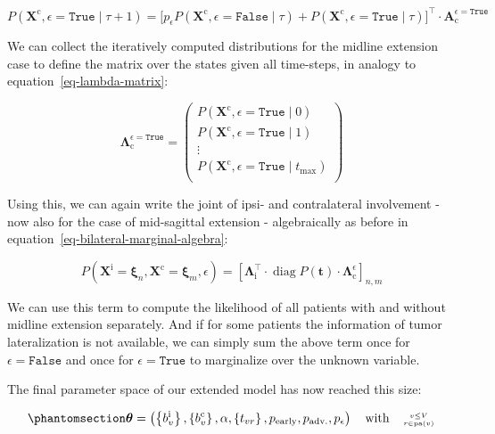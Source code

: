 \documentclass[
  sn-mathphys-num,
]{sn-jnl}
\begin{document}
\[
P \left( \mathbf{X}^\text{c}, \epsilon=\texttt{True} \mid \tau + 1 \right) = \big[ p_\epsilon P \left( \mathbf{X}^\text{c}, \epsilon=\texttt{False} \mid \tau \right) + P \left( \mathbf{X}^\text{c}, \epsilon=\texttt{True} \mid \tau \right) \big]^\top \cdot \mathbf{A}_\text{c}^{\epsilon=\texttt{True}}
\]

We can collect the iteratively computed distributions for the midline
extension case to define the matrix over the states given all
time-steps, in analogy to equation~\ref{eq-lambda-matrix}:

\[
\boldsymbol{\Lambda}_\text{c}^{\epsilon=\texttt{True}} = \begin{pmatrix}
P \left( \mathbf{X}^\text{c}, \epsilon=\texttt{True} \mid 0 \right) \\
P \left( \mathbf{X}^\text{c}, \epsilon=\texttt{True} \mid 1 \right) \\
\vdots \\
P \left( \mathbf{X}^\text{c}, \epsilon=\texttt{True} \mid t_\text{max} \right) \\
\end{pmatrix}
\]

Using this, we can again write the joint of ipsi- and contralateral
involvement - now also for the case of mid-sagittal extension -
algebraically as before in equation~\ref{eq-bilateral-marginal-algebra}:

\[
P \left( \mathbf{X}^\text{i} = \boldsymbol{\xi}_n, \mathbf{X}^\text{c} = \boldsymbol{\xi}_m, \epsilon \right) = \left[ \boldsymbol{\Lambda}^\intercal_\text{i} \cdot \operatorname{diag} P(\mathbf{t}) \cdot \boldsymbol{\Lambda}_\text{c}^\epsilon \right]_{n,m}
\]

We can use this term to compute the likelihood of all patients with and
without midline extension separately. And if for some patients the
information of tumor lateralization is not available, we can simply sum
the above term once for \(\epsilon=\texttt{False}\) and once for
\(\epsilon=\texttt{True}\) to marginalize over the unknown variable.

The final parameter space of our extended model has now reached this
size:

\begin{equation}\phantomsection\label{eq-ext-param-space}{
\boldsymbol{\theta} = \left( \left\{ b_v^\text{i} \right\}, \left\{ b_v^\text{c} \right\}, \alpha, \left\{ t_{vr} \right\}, p_\text{early}, p_\text{adv.}, p_\epsilon \right) \quad \text{with} \quad \genfrac{}{}{0pt}{2}{v\leq V}{r\in\operatorname{pa}(v)}
}\end{equation}
\end{document}

